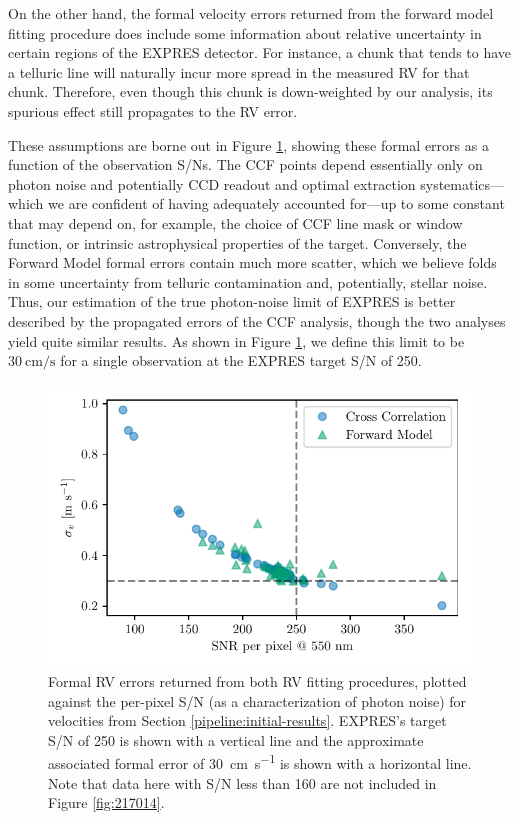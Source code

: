 On the other hand, the formal velocity errors returned from the forward model fitting procedure does include some information
about relative uncertainty in certain regions of the EXPRES detector. For instance, a chunk that tends to have a telluric line will naturally incur more spread in the measured RV for that chunk. Therefore, even though this chunk is down-weighted by our analysis, its spurious effect still propagates to the RV error.

These assumptions are borne out in Figure \ref{fig:snr}, showing these formal errors as a function of the observation S/Ns. The CCF points depend essentially only on photon noise and potentially CCD readout and optimal extraction systematics---which we are confident of having adequately accounted for---up to some constant that may depend on, for example, the choice of CCF line mask or window function, or intrinsic astrophysical properties of the target. Conversely, the Forward Model formal errors contain much more scatter, which we believe folds in some uncertainty from telluric contamination and, potentially, stellar noise. Thus, our estimation of the true photon-noise limit of EXPRES is better described by the propagated errors of the CCF analysis, though the two analyses yield quite similar results. As shown in Figure \ref{fig:snr}, we define this limit to be $30~\si{\centi\meter\per\second}$ for a single observation at the EXPRES target S/N of 250.

\begin{figure}
    \centering
    \includegraphics{figures-4/err_vs_snr.pdf}
    \caption[EXPRES formal radial velocity errors]{Formal RV errors returned from both RV fitting procedures, plotted against the per-pixel S/N (as a characterization of photon noise) for velocities from Section \ref{pipeline:initial-results}. EXPRES's target S/N of 250 is shown with a vertical line and the approximate associated formal error of 30~\si{\centi\meter\per\second} is shown with a horizontal line. Note that data here with S/N less than 160 are not included in Figure \ref{fig:217014}.}
    \label{fig:snr}
\end{figure}

